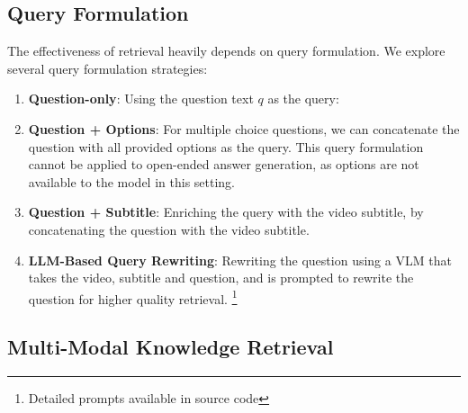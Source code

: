 \subsection{Query Formulation}
The effectiveness of retrieval heavily depends on query formulation. We explore several query formulation strategies:
\begin{enumerate}[leftmargin=*]
\item \textbf{Question-only}: Using the question text $q$ as the query:

\item \textbf{Question + Options}: For multiple choice questions, we can concatenate the question with all provided options as the query. This query formulation cannot be applied to open-ended answer generation, as options are not available to the model in this setting.

\item \textbf{Question + Subtitle}: Enriching the query with the video subtitle, by concatenating the question with the video subtitle.

\item \textbf{LLM-Based Query Rewriting}: Rewriting the question using a VLM that takes the video, subtitle and question, and is prompted to rewrite the question for higher quality retrieval. \footnote{Detailed prompts available in source code}

\end{enumerate}

\subsection{Multi-Modal Knowledge Retrieval}

